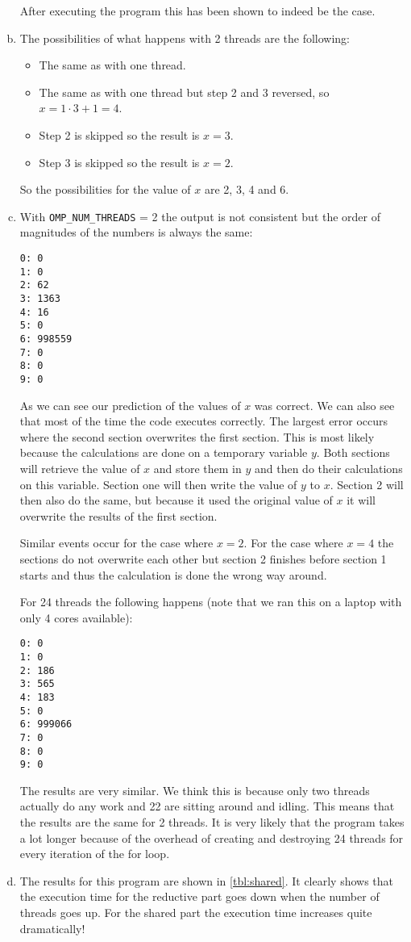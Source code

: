 \documentclass[a4paper]{article}
\begin{document}
\begin{enumerate}[(a)]
		After executing the program this has been shown to indeed be the case.
	\item The possibilities of what happens with 2 threads are the following:
		\begin{itemize}
			\item The same as with one thread.
			\item The same as with one thread but step 2 and 3 reversed, so $x = 1 \cdot 3 + 1 = 4$.
			\item Step 2 is skipped so the result is $x = 3$.
			\item Step 3 is skipped so the result is $x = 2$.
		\end{itemize}
		So the possibilities for the value of $x$ are 2, 3, 4 and 6.
	\item With \texttt{OMP\_NUM\_THREADS} = 2 the output is not consistent but the order of magnitudes of the numbers is always the same:
	\begin{lstlisting}
0: 0
1: 0
2: 62
3: 1363
4: 16
5: 0
6: 998559
7: 0
8: 0
9: 0
	\end{lstlisting}
	As we can see our prediction of the values of $x$ was correct. We can also see that most of the time the code executes correctly. The largest error occurs where the second section overwrites the first section. This is most likely because the calculations are done on a temporary variable $y$. Both sections will retrieve the value of $x$ and store them in $y$ and then do their calculations on this variable. Section one will then write the value of $y$ to $x$. Section 2 will then also do the same, but because it used the original value of $x$ it will overwrite the results of the first section.
	
	Similar events occur for the case where $x = 2$. For the case where $x=4$ the sections do not overwrite each other but section 2 finishes before section 1 starts and thus the calculation is done the wrong way around.
	
	For 24 threads the following happens (note that we ran this on a laptop with only 4 cores available):
	\begin{lstlisting}
0: 0
1: 0
2: 186
3: 565
4: 183
5: 0
6: 999066
7: 0
8: 0
9: 0
	\end{lstlisting}
	The results are very similar. We think this is because only two threads actually do any work and 22 are sitting around and idling. This means that the results are the same for 2 threads. It is very likely that the program takes a lot longer because of the overhead of creating and destroying 24 threads for every iteration of the for loop.
	\item The results for this program are shown in \autoref{tbl:shared}. It clearly shows that the execution time for the reductive part goes down when the number of threads goes up. For the shared part the execution time increases quite dramatically!
	

\end{enumerate}
\end{document}
